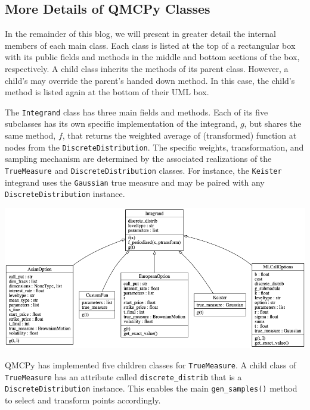 \subsection{More Details of QMCPy Classes}

In the remainder of this blog, we will present in greater detail the internal members of each main class. Each class is listed at the top of a rectangular box with its public fields and methods in the middle and bottom sections of  the box, respectively. 
A child class inherits the methods of its parent class.  However, a child's may override the parent's handed down method. In this case, the child's method is listed again at the bottom of their UML box. 

The \texttt{Integrand} class  has three main fields and methods. Each of its five subclasses has its own specific implementation of the integrand, $g$, but shares the same method, $f$, that returns the weighted average of (transformed) function at nodes from the \texttt{DiscreteDistribution}.  The specific weights, transformation, and sampling mechanism are determined by the associated realizations of the \texttt{TrueMeasure}  and \texttt{DiscreteDistribution} classes. For instance, the \texttt{Keister} integrand uses the \texttt{Gaussian} true measure and may be paired with any \texttt{DiscreteDistribution} instance.

\begin{center}
\includegraphics[width=1\textwidth]{uml/integrand_blog_uml.png}      
\end{center} 


QMCPy has implemented five children classes for \texttt{TrueMeasure}. A child class of \texttt{TrueMeasure} has an attribute called \texttt{discrete\_distrib} that is a \texttt{DiscreteDistribution} instance. This enables the main \texttt{gen\_samples()} method to select and transform points accordingly. 


